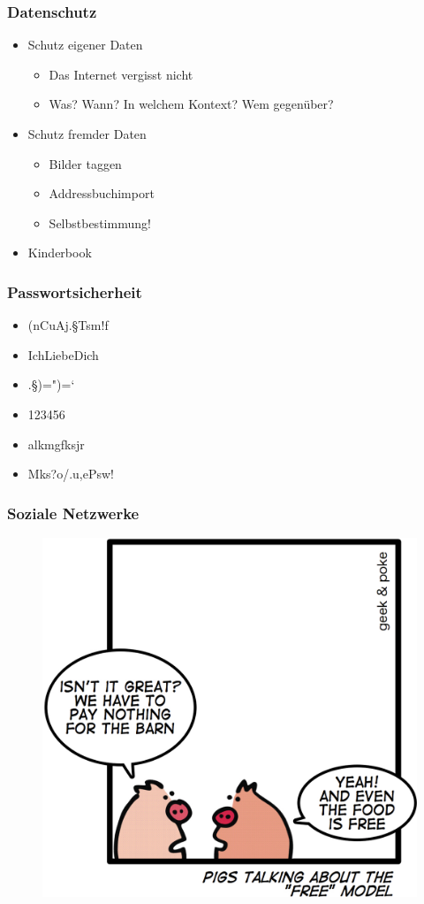 \documentclass[12pt]{beamer}
\begin{document}
\begin{frame}
  \frametitle{Datenschutz}
  \begin{itemize}
    \item<2-> Schutz eigener Daten
    \begin{itemize}
      \item<3-> Das Internet vergisst nicht
      \item<4-> Was? Wann? In welchem Kontext? Wem gegenüber?
    \end{itemize}
    \item<5-> Schutz fremder Daten
    \begin{itemize}
      \item<6-> Bilder taggen
      \item<7-> Addressbuchimport
      \item<8-> Selbstbestimmung!
    \end{itemize}
    \item<9-> Kinderbook
  \end{itemize}
\end{frame}

\begin{frame}
  \frametitle{Passwortsicherheit}
  \begin{itemize}
    \item (nCuAj.§Tsm!f
    \item IchLiebeDich
    \item .§)=")=`
    \item 123456
    \item alkmgfksjr
    \item Mks?o/.u,ePsw!
  \end{itemize}
\end{frame}

\begin{frame}
  \frametitle{Soziale Netzwerke}
  \begin{figure}
    \includegraphics[height=0.7\textheight]{img/business_pigs.jpg}
  \end{figure}
\end{frame}
\end{document}
